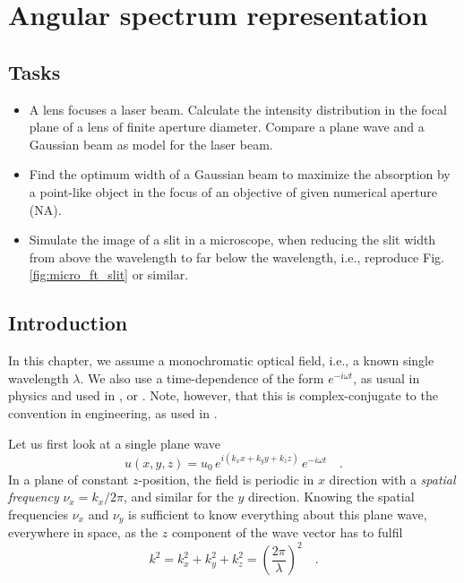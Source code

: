 \renewcommand{\lastmod}{January 14, 2022}
\renewcommand{\chapterauthors}{Markus Lippitz}


\chapter{Angular spectrum representation}
\label{chap:angular}

\section{Tasks}

\begin{itemize}

\item A lens focuses a laser beam. Calculate the intensity distribution in the focal plane of a lens of finite aperture diameter. Compare  a plane wave and a Gaussian beam as model for the laser beam.
        
\item Find the optimum width of a Gaussian beam to maximize the absorption by a point-like object in the focus of an objective of given numerical aperture (NA).
  
\item Simulate the image of a slit in a microscope, when reducing the slit width from above the wavelength to far below the wavelength, i.e.,  reproduce Fig. \ref{fig:micro_ft_slit} or similar.
        
\end{itemize}




\section{Introduction}

In this chapter, we assume a monochromatic optical field, i.e., a known single wavelength $\lambda$. We also use  a time-dependence of the form $e^{-i \omega t}$, as usual in physics and used in \cite{Novotny-Hecht2012}, or \cite{Goodman2005}. Note, however, that this is complex-conjugate to the convention in engineering, as used in \cite{SalehTeich1991}.

Let us first look at a single plane wave
\begin{equation}
    u(x,y,z) = u_0 \, e^{i (k_x x + k_y y + k_z z)} \, e^{-i \omega t} \quad .
\end{equation}
In a plane of constant $z$-position, the field is periodic in $x$ direction with a \emph{spatial frequency} $\nu_x = k_x / 2 \pi$, and similar for the $y$ direction. Knowing the spatial frequencies $\nu_x$ and $\nu_y$ is sufficient to know everything about this plane wave, everywhere in space, as the $z$ component of the wave vector has to fulfil 
\begin{equation}
    k^2 = k_x^2 + k_y^2 + k_z^2 = \left( \frac{2\pi}{\lambda} \right)^2 \quad .
    \label{eq:micros_ksq}
\end{equation}

